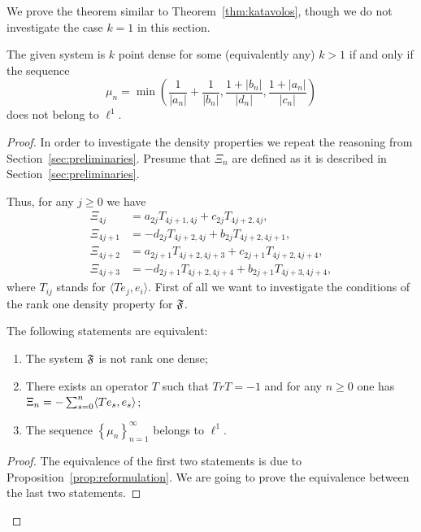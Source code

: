   We prove the theorem similar to Theorem~\ref{thm:katavolos}, though we do not investigate the case $k = 1$ in this section.
    \begin{theorem}
      The given system is $k$ point dense for some (equivalently any) $k > 1$ if and only if the sequence
      \[
        \mu_n = \min\left(\frac{1}{\lvert a_n \rvert} + \frac{1}{\lvert b_n \rvert}, \frac{1 + \lvert b_n\rvert}{\lvert d_n\rvert}, \frac{1 + \lvert a_n\rvert}{\lvert c_n\rvert}\right)
      \]
        does not belong to $\ell^1$.
    \end{theorem}
    \begin{proof}
      In order to investigate the density properties we repeat the reasoning from Section~\ref{sec:preliminaries}.
      Presume that $\Xi_n$ are defined as it is described in Section~\ref{sec:preliminaries}.

      Thus, for any $j \geq 0$ we have
      \begin{align*}
        \Xi_{4j} &= a_{2j} T_{4j+1, 4j} + c_{2j} T_{4j+2, 4j},\\
        \Xi_{4j + 1} &= -d_{2j} T_{4j+2, 4j} + b_{2j} T_{4j+2, 4j+1},\\
        \Xi_{4j + 2} &= a_{2j+1} T_{4j+2, 4j+3} + c_{2j+1} T_{4j+2, 4j+4},\\
        \Xi_{4j + 3} &= -d_{2j+1} T_{4j+2, 4j+4} + b_{2j+1} T_{4j+3, 4j+4},
      \end{align*}
        where $T_{ij}$ stands for $\langle Te_j, e_i \rangle$.
      First of all we want to investigate the conditions of the rank one density property for $\mathfrak{F}$.
      \begin{prop}
        \label{prop:inf-dim}
        The following statements are equivalent:
        \begin{enumerate}
          \item The system $\mathfrak{F}$ is not rank one dense;
          \item There exists an operator $T$ such that $TrT = -1$ and for any $n \geq 0$ one has $\Xi_n = -\sum_{s=0}^n \langle Te_s, e_s \rangle$;
          \item The sequence $\left\{\mu_n\right\}_{n=1}^\infty$ belongs to $\ell^1$.
        \end{enumerate}
      \end{prop}
      \begin{proof}
        The equivalence of the first two statements is due to Proposition~\ref{prop:reformulation}.
        We are going to prove the equivalence between the last two statements.


\end{proof}
\end{proof}

